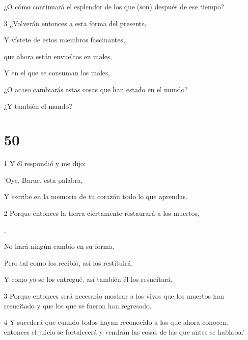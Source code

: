 \par ¿O cómo continuará el esplendor de los que (son) después de ese tiempo?

\par 3 ¿Volverán entonces a esta forma del presente,

\par Y vístete de estos miembros fascinantes,

\par que ahora están envueltos en males,

\par Y en el que se consuman los males,

\par ¿O acaso cambiarás estas cosas que han estado en el mundo?

\par ¿Y también el mundo?

\chapter{50}

\par 1 Y él respondió y me dijo:

\par 'Oye, Baruc, esta palabra,

\par Y escribe en la memoria de tu corazón todo lo que aprendas.

\par 2 Porque entonces la tierra ciertamente restaurará a los muertos,

\par [Que ahora recibe, para poder conservarlos].

\par No hará ningún cambio en su forma,

\par Pero tal como los recibió, así los restituirá,

\par Y como yo se los entregué, así también él los resucitará.

\par 3 Porque entonces será necesario mostrar a los vivos que los muertos han resucitado y que los que se fueron han regresado.

\par 4 Y sucederá que cuando todos hayan reconocido a los que ahora conocen, entonces el juicio se fortalecerá y vendrán las cosas de las que antes se hablaba.'


